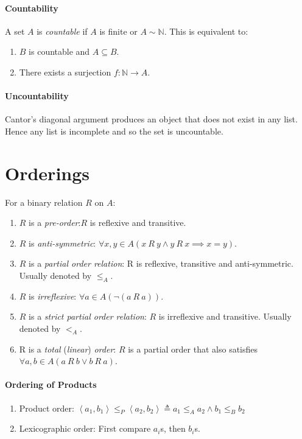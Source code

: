 \documentclass[10pt,twoside,twocolumn]{article}
\newcommand{\N}[0]{\mathds{N}} %
\begin{document}
\paragraph{Countability}

A set $A$ is \emph{countable} if $A$ is finite or $A\sim\N$. This
is equivalent to:
\begin{enumerate}
\item $B$ is countable and $A\subseteq B$.
\item There exists a surjection $f:\N\rightarrow A$.
\end{enumerate}

\paragraph{Uncountability}

Cantor's diagonal argument produces an object that does not exist
in any list. Hence any list is incomplete and so the set is uncountable.


\section{Orderings}

For a binary relation $R$ on $A$:
\begin{enumerate}
\item $R$ is a \emph{pre-order}:$R$ is reflexive and transitive.
\item $R$ is \emph{anti-symmetric}: $\forall x,y\in A\left(x\:R\:y\land y\:R\:x\implies x=y\right)$.
\item $R$ is a \emph{partial order relation}: R is reflexive, transitive
and anti-symmetric. Usually denoted by $\leq_{A}$.
\item $R$ is \emph{irreflexive}: $\forall a\in A\left(\lnot\left(a\:R\:a\right)\right)$.
\item $R$ is a \emph{strict partial order relation}: $R$ is irreflexive
and transitive. Usually denoted by $<_{A}$.
\item R is a \emph{total} (\emph{linear}) \emph{order}: $R$ is a partial
order that also satisfies $\forall a,b\in A\left(a\:R\:b\lor b\:R\:a\right)$.
\end{enumerate}

\paragraph{Ordering of Products}
\begin{enumerate}
\item Product order: $\left\langle a_{1},b_{1}\right\rangle \leq_{P}\left\langle a_{2},b_{2}\right\rangle \triangleq a_{1}\leq_{A}a_{2}\land b_{1}\leq_{B}b_{2}$
\item Lexicographic order: First compare $a_{i}$s, then $b_{i}$s.
\end{enumerate}
\end{document}
